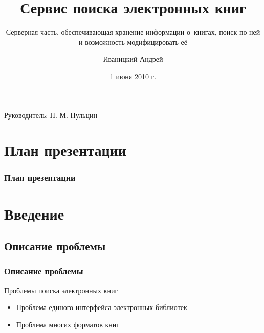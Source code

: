 \documentclass[utf8,handout]{beamer}
\title{Сервис поиска электронных книг}
\subtitle{Серверная часть, обеспечивающая хранение информации о~книгах, поиск по ней и возможность модифицировать её}
\author{Иваницкий Андрей}
\institute{Санкт-Петербургский Академический Университет РАН}
\date{1 июня 2010 г.}
\begin{document}
\begin{frame}
	\titlepage
	\begin{flushright}
    Руководитель: Н. М. Пульцин

  \end{flushright}
\end{frame}

\section*{План презентации}
	\begin{frame}
		\frametitle{План презентации}
		\tableofcontents[pausesections]
	\end{frame}

\section{Введение}
\subsection{Описание проблемы}
  \begin{frame}

    \frametitle{Описание проблемы}
      Проблемы поиска электронных книг
	      \begin{itemize}
            \item Проблема единого интерфейса электронных библиотек
            \item Проблема многих форматов книг
	      \end{itemize}
  \end{frame}

%
%
\end{document}
